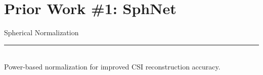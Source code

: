 \documentclass{beamer}
\begin{document}



\section{Prior Work \#1: SphNet}

  \begin{frame}[plain]
    \vfill
    \centering
    \begin{beamercolorbox}[sep=8pt,center,shadow=true,rounded=true]{Spherical Normalization}
      \insertsectionhead\par%
      \color{davisblue}\noindent\rule{10cm}{1pt} \\
      \footnotesize{Power-based normalization for improved CSI reconstruction accuracy.}
    \end{beamercolorbox}
    \vfill
  \end{frame}
\end{document}
